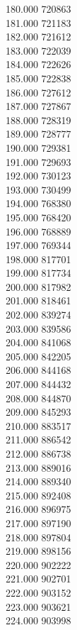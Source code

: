 { 180.000	720863 \\
 181.000	721183 \\
 182.000	721612 \\
 183.000	722039 \\
 184.000	722626 \\
 185.000	722838 \\
 186.000	727612 \\
 187.000	727867 \\
 188.000	728319 \\
 189.000	728777 \\
 190.000	729381 \\
 191.000	729693 \\
 192.000	730123 \\
 193.000	730499 \\
 194.000	768380 \\
 195.000	768420 \\
 196.000	768889 \\
 197.000	769344 \\
 198.000	817701 \\
 199.000	817734 \\
 200.000	817982 \\
 201.000	818461 \\
 202.000	839274 \\
 203.000	839586 \\
 204.000	841068 \\
 205.000	842205 \\
 206.000	844168 \\
 207.000	844432 \\
 208.000	844870 \\
 209.000	845293 \\
 210.000	883517 \\
 211.000	886542 \\
 212.000	886738 \\
 213.000	889016 \\
 214.000	889340 \\
 215.000	892408 \\
 216.000	896975 \\
 217.000	897190 \\
 218.000	897804 \\
 219.000	898156 \\
 220.000	902222 \\
 221.000	902701 \\
 222.000	903152 \\
 223.000	903621 \\
 224.000	903998 \\
}
